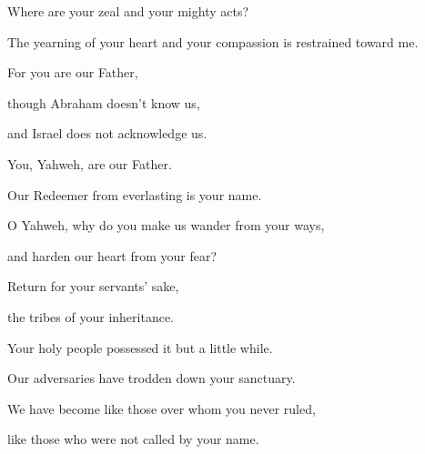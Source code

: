 {\par }{\Q Where are your zeal and your mighty acts?
\par }{\QB The yearning of your heart and your compassion is restrained toward me.
\par }{\Q {}For you are our Father,
\par }{\QB though Abraham doesn’t know us,
\par }{\QB and Israel does not acknowledge us.
\par }{\Q You, Yahweh, are our Father.
\par }{\QB Our Redeemer from everlasting is your name.
\par }{\Q {}O Yahweh, why do you make us wander from your ways,
\par }{\QB and harden our heart from your fear?
\par }{\Q Return for your servants’ sake,
\par }{\QB the tribes of your inheritance.
\par }{\Q {}Your holy people possessed it but a little while.
\par }{\QB Our adversaries have trodden down your sanctuary.
\par }{\Q {}We have become like those over whom you never ruled,
\par }{\QB like those who were not called by your name.

}
